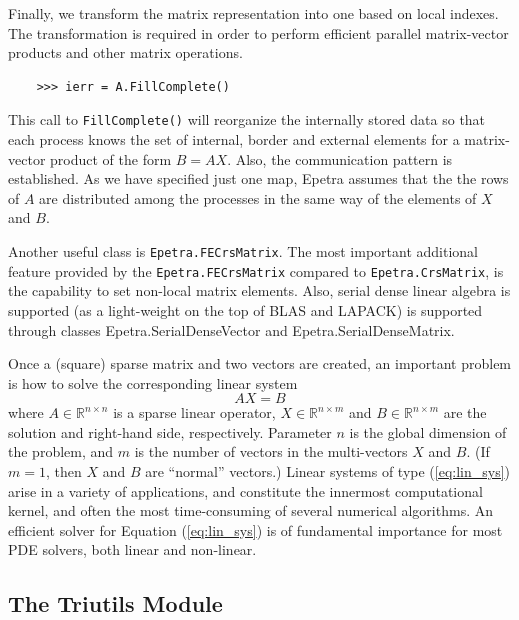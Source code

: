 \documentclass[10pt,relax]{SANDreport}
\begin{document}
Finally, we transform the matrix representation into one based on
local indexes. The transformation is required in order to perform
efficient parallel matrix-vector products and other matrix operations.
\begin{verbatim}
    >>> ierr = A.FillComplete()
\end{verbatim}

This call to {\tt FillComplete()} will reorganize the internally
stored data so that each process knows the set of internal, border and
external elements for a matrix-vector product of the form $B =
AX$. Also, the communication pattern is established. As we have
specified just one map, Epetra assumes that the the rows of $A$ are
distributed among the processes in the same way of the elements of $X$
and $B$.

Another useful class is {\tt Epetra.FECrsMatrix}.  The most important
additional feature provided by the {\tt Epetra.FECrsMatrix} compared
to {\tt Epetra.CrsMatrix}, is the capability to set non-local matrix
elements. Also, serial dense linear algebra is supported 
(as a light-weight on the top of BLAS and LAPACK) is supported through classes
Epetra.SerialDenseVector and Epetra.SerialDenseMatrix.

\smallskip

Once a (square) sparse matrix and two vectors are created, an
important problem is how to solve the corresponding linear system
\begin{equation}
  \label{eq:lin_sys}
  A X = B
\end{equation}
where $A \in \mathbb{R}^{n \times n}$ is a sparse linear operator, $X
\in \mathbb{R}^{n \times m}$ and $B \in \mathbb{R}^{n \times m}$ are
the solution and right-hand side, respectively. Parameter $n$ is the
global dimension of the problem, and $m$ is the number of vectors in
the multi-vectors $X$ and $B$.  (If $m = 1$, then $X$ and $B$ are
``normal'' vectors.)  Linear systems of type (\ref{eq:lin_sys}) arise
in a variety of applications, and constitute the innermost
computational kernel, and often the most time-consuming of several
numerical algorithms. An efficient solver for Equation
(\ref{eq:lin_sys}) is of fundamental importance for most PDE solvers,
both linear and non-linear.

\subsection{The Triutils Module}
\label{subsec:triutils}
\end{document}

